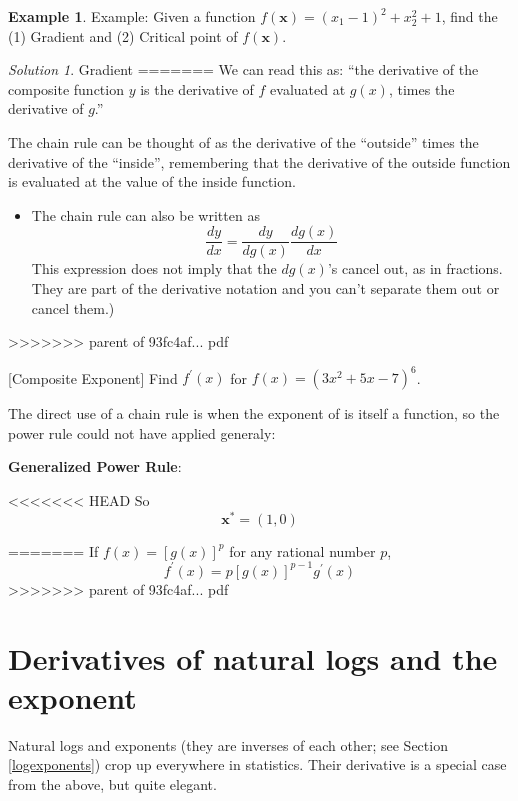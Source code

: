 \documentclass[]{book}
\providecommand{\tightlist}{%
  \setlength{\itemsep}{0pt}\setlength{\parskip}{0pt}}
\theoremstyle{definition}
\theoremstyle{definition}
\newtheorem{example}{Example}[chapter]
\theoremstyle{definition}
\theoremstyle{remark}
\newtheorem*{solution}{Solution}
\begin{document}
\begin{example}
\protect\hypertarget{exm:unnamed-chunk-54}{}{\label{exm:unnamed-chunk-54} }
Example: Given a function \(f(\mathbf{x})=(x_1-1)^2+x_2^2+1\), find the (1) Gradient and (2) Critical point of \(f(\mathbf{x})\).
\end{example}

\begin{solution}
{}Gradient
=======
We can read this as: ``the derivative of the composite function \(y\) is the derivative of \(f\) evaluated at \(g(x)\), times the derivative of \(g\).''

The chain rule can be thought of as the derivative of the ``outside'' times the derivative of the ``inside'', remembering that the derivative of the outside function is evaluated at the value of the inside function.

\begin{itemize}
\tightlist
\item
  The chain rule can also be written as \[\frac{dy}{dx}=\frac{dy}{dg(x)} \frac{dg(x)}{dx}\] This expression does not imply that the \(dg(x)\)'s cancel out, as in fractions. They are part of the derivative notation and you can't separate them out or cancel them.)
\end{itemize}
>>>>>>> parent of 93fc4af... pdf

[Composite Exponent]
\protect\hypertarget{exm:tothesix}{}{\label{exm:tothesix} {} }Find \(f^\prime(x)\) for \(f(x) = (3x^2+5x-7)^6\).

The direct use of a chain rule is when the exponent of is itself a function, so the power rule could not have applied generaly:

\textbf{Generalized Power Rule}:

<<<<<<< HEAD
So \[\mathbf{x}^* = (1,0)\]
\end{solution}
=======
If \(f(x)=[g(x)]^p\) for any rational number \(p\), \[f^\prime(x) =p[g(x)]^{p-1}g^\prime(x)\]
>>>>>>> parent of 93fc4af... pdf

\hypertarget{derivatives-of-natural-logs-and-the-exponent}{%
\section{Derivatives of natural logs and the exponent}\label{derivatives-of-natural-logs-and-the-exponent}}

Natural logs and exponents (they are inverses of each other; see Section \ref{logexponents}) crop up everywhere in statistics. Their derivative is a special case from the above, but quite elegant.
\end{document}

